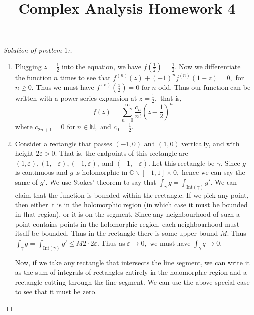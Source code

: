 \documentclass[letterpaper,11pt,twoside]{article}
\title{Complex Analysis Homework 4}
\theoremstyle{proposition}
\theoremstyle{definition}
\theoremstyle{theorem}
\theoremstyle{definition}
\theoremstyle{definition}
\theoremstyle{definition}
\theoremstyle{lemma}
\theoremstyle{definition}
\theoremstyle{definition}
\theoremstyle{corollary}
\theoremstyle{definition}
\theoremstyle{definition}
\theoremstyle{definition}
\begin{document}
	\maketitle
	\begin{proof}[Solution of problem $1$:]
		\begin{enumerate}
			\item Plugging $z= \frac{1}{2}$ into the equation, we have $f\left(\frac{1}{2}\right)= \frac{1}{2}.$ Now we differentiate the function $n$ times 
			to see that $f^{(n)}(z) + (-1)^{n}f^{(n)}(1-z)=0,$ for $n \geq 0.$ Thus we must have $f^{(n)}\left(\frac{1}{2}\right)=0$ for $n$ odd. Thus our 
			function can be written with a power series expansion at $z= \frac{1}{2},$ that is, $$f(z)= \sum_{n=0}^{\infty} \frac{c_n}{n!}\left(z- 
			\frac{1}{2}\right)^n $$ where $c_{2n+1}=0$ for $n \in \mathbb{N},$ and $c_0= \frac{1}{2}.$
			
			\item   Consider a rectangle that passes $(-1,0)$ and $(1,0)$ vertically, and with height $2\varepsilon>0.$ That is, the endpoints of this 
			rectangle are $(1, \varepsilon ),(1, -\varepsilon), (-1, \varepsilon),$ and $(-1, -\varepsilon).$ Let this rectangle be $\gamma.$  Since $g$ is 
			continuous and $g$ is holomorphic in $ \mathbb{C} \backslash [-1,1] \times 0,$ hence we can say the same of $g'.$ We use Stokes' theorem to say 
			that $\int_{\gamma}g = \int_{\text{Int}(\gamma)}g'.$ We can claim that the function is bounded within the rectangle. If we pick any point, then 
			either it is in the holomorphic region (in which case it must be bounded in that region), or it is on the segment. Since any neighbourhood of 
			such a point contains points in the holomorphic region, each neighbourhood must itself be bounded. Thus in the rectangle there is some upper 
			bound $M.$ Thus $ \int_{\gamma}g = \int_{\text{Int}(\gamma)}g' \leq M 2 \cdot 2 \varepsilon. $ Thus as $\varepsilon \to 0,$ we must have 
			$\int_{\gamma}g \to 0.$ 
					
			Now, if we take any rectangle that intersects the line segment, we can write it as the sum of integrals of rectangles entirely in the 
			holomorphic region and a rectangle cutting through the line segment. We can use the above special case to see that it must be zero.    
			
		\end{enumerate}
	\end{proof}
\end{document}
